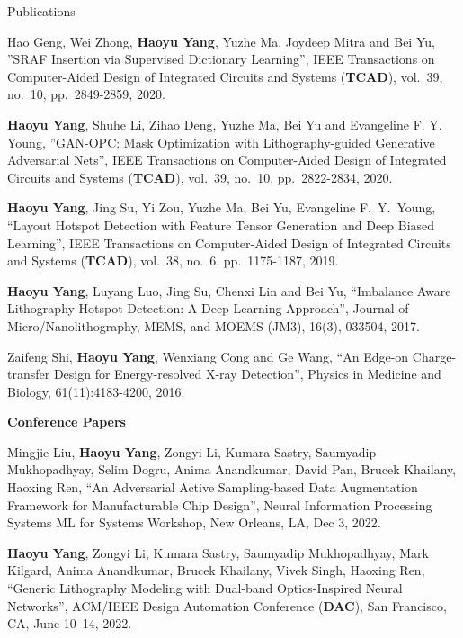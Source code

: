 \begin{rSection}{Publications}
\begin{description}[font=\normalfont]
\item[{[J5]}]{
	Hao Geng, Wei Zhong, \textbf{Haoyu Yang}, Yuzhe Ma, Joydeep Mitra and Bei Yu, ''SRAF Insertion via Supervised Dictionary Learning'', IEEE Transactions on Computer-Aided Design of Integrated Circuits and Systems (\textbf{TCAD}), vol.~39, no.~10, pp.~2849-2859, 2020.
}	
	
\item[{[J4]}]{
	\textbf{Haoyu Yang}, Shuhe Li, Zihao Deng, Yuzhe Ma, Bei Yu and Evangeline F. Y. Young, ''GAN-OPC: Mask Optimization with Lithography-guided Generative Adversarial Nets'', IEEE Transactions on Computer-Aided Design of Integrated Circuits and Systems (\textbf{TCAD}), vol.~39, no.~10, pp.~2822-2834, 2020.
}

\item[{[J3]}]{
	\textbf{Haoyu Yang}, Jing Su, Yi Zou, Yuzhe Ma, Bei Yu, Evangeline F.~Y.~Young, ``Layout Hotspot Detection with Feature Tensor Generation and Deep Biased Learning'', IEEE Transactions on Computer-Aided Design of Integrated Circuits and Systems (\textbf{TCAD}), vol.~38, no.~6, pp.~1175-1187, 2019.
}
	
\item[{[J2]}]{
	\textbf{Haoyu Yang}, Luyang Luo, Jing Su, Chenxi Lin and Bei Yu, ``Imbalance Aware Lithography Hotspot Detection: A Deep Learning Approach'', Journal of Micro/Nanolithography, MEMS, and MOEMS (JM3), 16(3), 033504, 2017.
}

\item[{[J1]}]{
    Zaifeng Shi, \textbf{Haoyu Yang}, Wenxiang Cong and Ge Wang,
    ``An Edge-on Charge-transfer Design for Energy-resolved X-ray Detection'',
    Physics in Medicine and Biology, 61(11):4183-4200, 2016.
}

\end{description}

\textbf{Conference Papers}
\begin{description}[font=\normalfont]
	
	\item[{[C25]}] Mingjie Liu, \textbf{Haoyu Yang}, Zongyi Li, Kumara Sastry, Saumyadip Mukhopadhyay, Selim Dogru, Anima Anandkumar, David Pan, Brucek Khailany, Haoxing Ren,
	``An Adversarial Active Sampling-based Data Augmentation Framework for Manufacturable Chip Design'',
	Neural Information Processing Systems ML for Systems Workshop, New Orleans, LA, Dec 3, 2022.
	
	\item[{[C24]}] \textbf{Haoyu Yang}, Zongyi Li, Kumara Sastry, Saumyadip Mukhopadhyay, Mark Kilgard, Anima Anandkumar, Brucek Khailany, Vivek Singh, Haoxing Ren,
	``Generic Lithography Modeling with Dual-band Optics-Inspired Neural Networks'',
	ACM/IEEE Design Automation Conference (\textbf{DAC}), San Francisco, CA, June 10–14, 2022.
	

\end{description}
\end{rSection}

